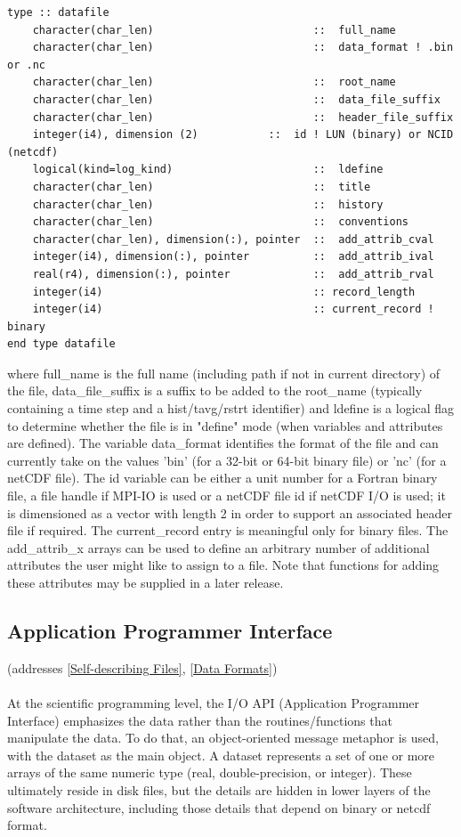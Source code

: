 \documentclass[11pt]{article}
\begin{document}
\begin{verbatim}
type :: datafile
    character(char_len)                         ::  full_name
    character(char_len)                         ::  data_format ! .bin or .nc
    character(char_len)                         ::  root_name
    character(char_len)                         ::  data_file_suffix
    character(char_len)                         ::  header_file_suffix
    integer(i4), dimension (2)           ::  id ! LUN (binary) or NCID (netcdf)
    logical(kind=log_kind)                      ::  ldefine
    character(char_len)                         ::  title
    character(char_len)                         ::  history
    character(char_len)                         ::  conventions
    character(char_len), dimension(:), pointer  ::  add_attrib_cval
    integer(i4), dimension(:), pointer          ::  add_attrib_ival
    real(r4), dimension(:), pointer             ::  add_attrib_rval
    integer(i4)                                 :: record_length
    integer(i4)                                 :: current_record ! binary
end type datafile
\end{verbatim}
\noindent
where full\_name is the full name
(including path if not in current directory) of the file,
data\_file\_suffix is a suffix to be added to the root\_name
(typically containing a time step and a hist/tavg/rstrt identifier)
and ldefine is a logical flag to determine whether the file is in
"define" mode (when variables and attributes are defined).
The variable data\_format identifies the format of the file
and can currently take on the values 'bin' (for a 32-bit or
64-bit binary file) or 'nc' (for a netCDF file).
The id variable can be either a unit number for a Fortran binary file,
a file handle if MPI-IO is used
or a netCDF file id if netCDF I/O is used; it is dimensioned as a vector
with length 2 in order to support an associated header file if required.
The current\_record entry is meaningful only for binary files.
The add\_attrib\_x arrays can be used to define an arbitrary number
of additional attributes the user might like to assign to a file.
Note that functions for adding these attributes may be supplied in a
later release.

\subsection{Application Programmer Interface}
\label{Application Programmer Interface}
(addresses \ref{Self-describing Files}, \ref{Data Formats})
\paragraph{}
At the scientific programming level,
the I/O API (Application Programmer Interface) emphasizes the data
rather than the routines/functions that manipulate the data.
To do that, an object-oriented message metaphor is used, with the
dataset as the main object.
A dataset represents a set of one or more arrays of the same numeric type
(real, double-precision, or integer).
These ultimately reside in disk files, but the details are hidden
in lower layers of the software architecture, including those details
that depend on binary or netcdf format.
\end{document}
